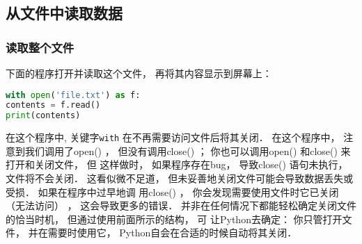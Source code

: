 \subsection{从文件中读取数据}
\subsubsection{读取整个文件}
下面的程序打开并读取这个文件， 再将其内容显示到屏幕上：
\begin{lstlisting}[language=python]
with open('file.txt') as f:
contents = f.read()
print(contents)
\end{lstlisting}
在这个程序中, 关键字\verb|with| 在不再需要访问文件后将其关闭． 在这个程序中， 注意到我们调用了open() ， 但没有调用close() ； 你也可以调用open() 和close() 来打开和关闭文件， 但
这样做时， 如果程序存在bug， 导致close() 语句未执行， 文件将不会关闭． 这看似微不足道， 但未妥善地关闭文件可能会导致数据丢失或受损． 如果在程序中过早地调
用close() ， 你会发现需要使用文件时它已关闭 （无法访问） ， 这会导致更多的错误． 并非在任何情况下都能轻松确定关闭文件的恰当时机， 但通过使用前面所示的结构， 可
让Python去确定： 你只管打开文件， 并在需要时使用它， Python自会在合适的时候自动将其关闭．